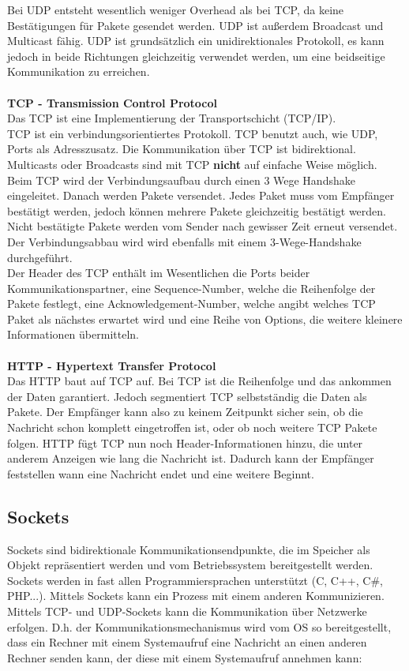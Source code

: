 Bei UDP entsteht wesentlich weniger Overhead als bei TCP, da keine Bestätigungen für Pakete gesendet werden.
UDP ist außerdem Broadcast und Multicast fähig. UDP ist grundsätzlich ein unidirektionales Protokoll, es kann jedoch in beide Richtungen gleichzeitig verwendet werden, um eine beidseitige Kommunikation zu erreichen.\\
\\
\textbf{TCP - Transmission Control Protocol}\\
Das TCP ist eine Implementierung der Transportschicht (TCP/IP).\\
TCP ist ein verbindungsorientiertes Protokoll. TCP benutzt auch, wie UDP, Ports als Adresszusatz. Die Kommunikation über TCP ist bidirektional. Multicasts oder Broadcasts sind mit TCP \textbf{nicht} auf einfache Weise möglich.\\
Beim TCP wird der Verbindungsaufbau durch einen 3 Wege Handshake eingeleitet. Danach werden Pakete versendet. Jedes Paket muss vom Empfänger bestätigt werden, jedoch können mehrere Pakete gleichzeitig bestätigt werden. Nicht bestätigte Pakete werden vom Sender nach gewisser Zeit erneut versendet. Der Verbindungsabbau wird wird ebenfalls mit einem 3-Wege-Handshake durchgeführt.\\
Der Header des TCP enthält im Wesentlichen die Ports beider Kommunikationspartner, eine Sequence-Number, welche die Reihenfolge der Pakete festlegt, eine Acknowledgement-Number, welche angibt welches TCP Paket als nächstes erwartet wird und eine Reihe von Options, die weitere kleinere Informationen übermitteln.\\
\\
\textbf{HTTP - Hypertext Transfer Protocol}\\
Das HTTP baut auf TCP auf. Bei TCP ist die Reihenfolge und das ankommen der Daten garantiert. Jedoch segmentiert TCP selbstständig die Daten als Pakete. Der Empfänger kann also zu keinem Zeitpunkt sicher sein, ob die Nachricht schon komplett eingetroffen ist, oder ob noch weitere TCP Pakete folgen. HTTP fügt TCP nun noch Header-Informationen hinzu, die unter anderem Anzeigen wie lang die Nachricht ist. Dadurch kann der Empfänger feststellen wann eine Nachricht endet und eine weitere Beginnt.

\subsection{Sockets}
Sockets sind bidirektionale Kommunikationsendpunkte, die im Speicher als Objekt repräsentiert werden und vom Betriebssystem bereitgestellt werden. Sockets werden in fast allen Programmiersprachen unterstützt (C, C++, C\#, PHP...). Mittels Sockets kann ein Prozess mit einem anderen Kommunizieren. Mittels TCP- und UDP-Sockets kann die Kommunikation über Netzwerke erfolgen. D.h. der Kommunikationsmechanismus wird vom OS so bereitgestellt, dass ein Rechner mit einem Systemaufruf eine Nachricht an einen anderen Rechner senden kann, der diese mit einem Systemaufruf annehmen kann:\\

